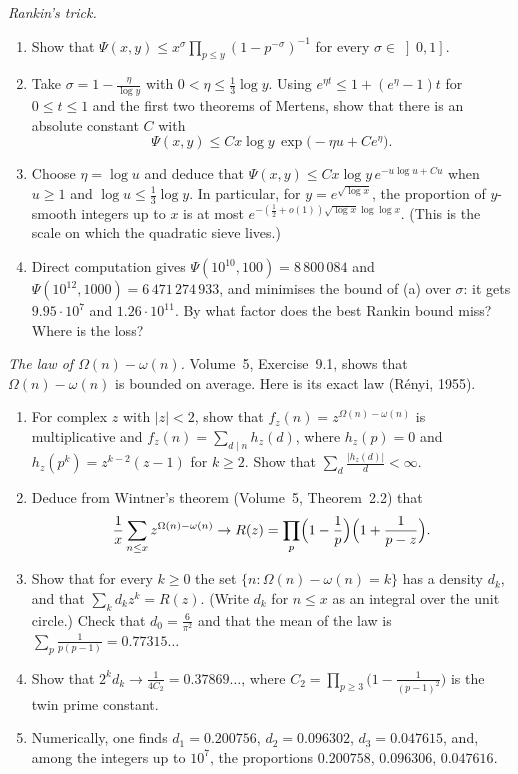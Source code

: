 \begin{exercise}[$\star\star$]\label{pb:rankin}
\emph{Rankin's trick.}
\begin{enumerate}[label=(\alph*)]
\item Show that $\Psi(x,y)\le x^\sigma\prod_{p\le y}(1-p^{-\sigma})^{-1}$ for every $\sigma\in\left]0,1\right]$.
\item Take $\sigma=1-\frac\eta{\log y}$ with $0<\eta\le\frac13\log y$. Using $e^{\eta t}\le1+(e^\eta-1)t$ for $0\le t\le1$ and the first two theorems of Mertens, show that
there is an absolute constant $C$ with
\[
\Psi(x,y)\le Cx\log y\,\exp\bigl(-\eta u+Ce^\eta\bigr).
\]
\item Choose $\eta=\log u$ and deduce that $\Psi(x,y)\le Cx\log y\,e^{-u\log u+Cu}$ when $u\ge1$ and $\log u\le\frac13\log y$. In particular, for $y=e^{\sqrt{\log x}}$,
the proportion of $y$-smooth integers up to $x$ is at most $e^{-(\frac12+o(1))\sqrt{\log x}\log\log x}$. (This is the scale on which the quadratic sieve lives.)
\item Direct computation gives $\Psi(10^{10},100)=8\,800\,084$ and $\Psi(10^{12},1000)=6\,471\,274\,933$, and minimises the bound of (a) over $\sigma$: it gets
$9.95\cdot10^7$ and $1.26\cdot10^{11}$. By what factor does the best Rankin bound miss? Where is the loss?
\end{enumerate}
\end{exercise}

\begin{exercise}[$\star\star\star$]\label{pb:renyi}
\emph{The law of $\Omega(n)-\omega(n)$.} Volume~5, Exercise~9.1, shows that $\Omega(n)-\omega(n)$ is bounded on average. Here is its exact law (R\'enyi, 1955).
\begin{enumerate}[label=(\alph*)]
\item For complex $z$ with $|z|<2$, show that $f_z(n)=z^{\Omega(n)-\omega(n)}$ is multiplicative and $f_z(n)=\sum_{d\mid n}h_z(d)$, where $h_z(p)=0$ and $h_z(p^k)=z^{k-2}(z-1)$ for $k\ge2$.
Show that $\sum_d\frac{|h_z(d)|}d<\infty$.
\item Deduce from Wintner's theorem (Volume~5, Theorem~2.2) that
\[
\frac1x\sum_{n\le x}z^{\Omega(n)-\omega(n)}\to R(z)=\prod_p\Bigl(1-\frac1p\Bigr)\Bigl(1+\frac1{p-z}\Bigr).
\]
\item Show that for every $k\ge0$ the set $\{n:\Omega(n)-\omega(n)=k\}$ has a density $d_k$, and that $\sum_kd_kz^k=R(z)$. (Write $d_k$ for $n\le x$ as an integral over the
unit circle.) Check that $d_0=\frac6{\pi^2}$ and that the mean of the law is $\sum_p\frac1{p(p-1)}=0.77315\ldots$
\item Show that $2^kd_k\to\frac1{4C_2}=0.37869\ldots$, where $C_2=\prod_{p\ge3}\bigl(1-\frac1{(p-1)^2}\bigr)$ is the twin prime constant.
\item Numerically, one finds $d_1=0.200756$, $d_2=0.096302$, $d_3=0.047615$, and, among the integers up to $10^7$, the proportions $0.200758$, $0.096306$, $0.047616$.
\end{enumerate}
\end{exercise}

